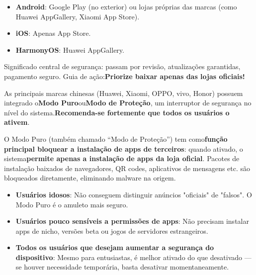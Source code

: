 


\begin{itemize}
  \item \textbf{Android}: Google Play (no exterior) ou lojas próprias das marcas (como Huawei AppGallery, Xiaomi App Store).
  \item \textbf{iOS}: Apenas App Store.
  \item \textbf{HarmonyOS}: Huawei AppGallery.
\end{itemize}

Significado central de segurança: passam por revisão, atualizações garantidas, pagamento seguro. Guia de ação:\textbf{Priorize baixar apenas das lojas oficiais!}


As principais marcas chinesas (Huawei, Xiaomi, OPPO, vivo, Honor) possuem integrado o\textbf{Modo Puro}ou\textbf{Modo de Proteção}, um interruptor de segurança no nível do sistema.\textbf{Recomenda-se fortemente que todos os usuários o ativem}.


O Modo Puro (também chamado “Modo de Proteção”) tem como\textbf{função principal bloquear a instalação de apps de terceiros}: quando ativado, o sistema\textbf{permite apenas a instalação de apps da loja oficial}. Pacotes de instalação baixados de navegadores, QR codes, aplicativos de mensagens etc. são bloqueados diretamente, eliminando malware na origem.


\begin{itemize}
  \item \textbf{Usuários idosos}: Não conseguem distinguir anúncios "oficiais" de "falsos". O Modo Puro é o amuleto mais seguro.
  \item \textbf{Usuários pouco sensíveis a permissões de apps}: Não precisam instalar apps de nicho, versões beta ou jogos de servidores estrangeiros.
  \item \textbf{Todos os usuários que desejam aumentar a segurança do dispositivo}: Mesmo para entusiastas, é melhor ativado do que desativado — se houver necessidade temporária, basta desativar momentaneamente.
\end{itemize}


